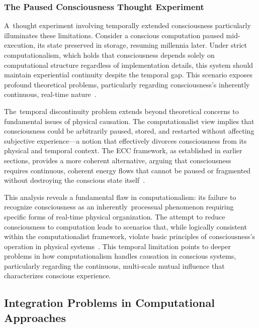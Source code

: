\subsubsection{The Paused Consciousness Thought Experiment}

A~thought experiment involving temporally extended consciousness particularly illuminates these limitations. Consider a conscious computation paused mid-execution, its state preserved in storage, resuming millennia later. Under strict computationalism, which holds that consciousness depends solely on computational structure regardless of implementation details, this system should maintain experiential continuity despite the temporal gap. This scenario exposes profound theoretical problems, particularly regarding consciousness's inherently continuous, real-time nature~\cite{dehaene2011experimental,mashour2020conscious}.

The~temporal discontinuity problem extends beyond theoretical concerns to fundamental issues of physical causation. The computationalist view implies that consciousness could be arbitrarily paused, stored, and restarted without affecting subjective experience—a notion that effectively divorces consciousness from its physical and temporal context. The ECC framework, as established in earlier sections, provides a more coherent alternative, arguing that consciousness requires continuous, coherent energy flows that cannot be paused or fragmented without destroying the conscious state itself~\cite{pinotsis2023vivo,bosl2025dynamical}.

This analysis reveals a fundamental flaw in computationalism: its failure to recognize consciousness as an inherently~processual phenomenon requiring specific forms of real-time physical organization. The attempt to reduce consciousness to computation leads to scenarios that, while logically consistent within the computationalist framework, violate basic principles of consciousness's operation in physical systems~\cite{da2024mathematical,van2025processes}. This temporal limitation points to deeper problems in how computationalism handles causation in conscious systems, particularly regarding the continuous, multi-scale mutual influence that characterizes conscious experience.

\subsection*{Integration Problems in Computational Approaches}

